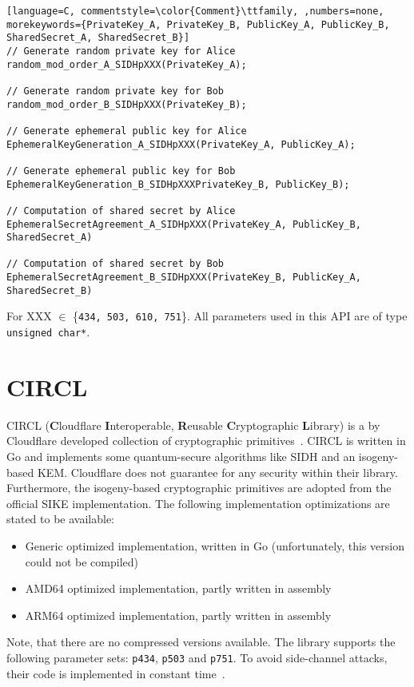 \begin{lstlisting}[language=C, commentstyle=\color{Comment}\ttfamily, ,numbers=none, morekeywords={PrivateKey_A, PrivateKey_B, PublicKey_A, PublicKey_B, SharedSecret_A, SharedSecret_B}]
// Generate random private key for Alice
random_mod_order_A_SIDHpXXX(PrivateKey_A);

// Generate random private key for Bob
random_mod_order_B_SIDHpXXX(PrivateKey_B);

// Generate ephemeral public key for Alice
EphemeralKeyGeneration_A_SIDHpXXX(PrivateKey_A, PublicKey_A);

// Generate ephemeral public key for Bob
EphemeralKeyGeneration_B_SIDHpXXXPrivateKey_B, PublicKey_B);

// Computation of shared secret by Alice
EphemeralSecretAgreement_A_SIDHpXXX(PrivateKey_A, PublicKey_B, SharedSecret_A)

// Computation of shared secret by Bob
EphemeralSecretAgreement_B_SIDHpXXX(PrivateKey_B, PublicKey_A, SharedSecret_B)

\end{lstlisting}
For XXX $\in$ \{\texttt{434, 503, 610, 751}\}. All parameters used in this API are of type \texttt{unsigned char*}.

\section{CIRCL}

CIRCL (\textbf{C}loudflare \textbf{I}nteroperable, \textbf{R}eusable \textbf{C}ryptographic \textbf{L}ibrary) is a by Cloudflare developed collection of cryptographic primitives~\parencite{circl2020github}. CIRCL is written in Go and implements some quantum-secure algorithms like SIDH and an isogeny-based KEM. Cloudflare does not guarantee for any security within their library. Furthermore, the isogeny-based cryptographic primitives are adopted from the official SIKE implementation. The following implementation optimizations are stated to be available:

\begin{itemize}
  \item Generic optimized implementation, written in Go (unfortunately, this version could not be compiled)
  \item AMD64 optimized implementation, partly written in assembly
  \item ARM64 optimized implementation, partly written in assembly
\end{itemize}
Note, that there are no compressed versions available. The library supports the following parameter sets: \texttt{p434}, \texttt{p503} and \texttt{p751}. To avoid side-channel attacks, their code is implemented in constant time~\parencite{circl2019intro}.

